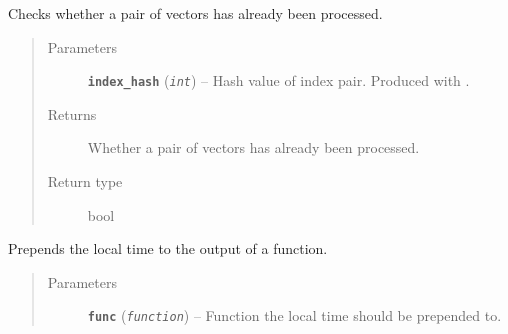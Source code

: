 \documentclass[letterpaper,10pt,english]{sphinxmanual}
\begin{document}
\begin{fulllineitems}
\begin{fulllineitems}
\end{fulllineitems}


\begin{fulllineitems}
\label{src.mapping:src.mapping.mapthreading.VectorDict.skippable}
Checks whether a pair of vectors has already been processed.
\begin{quote}\begin{description}
\item[{Parameters}] \leavevmode
\textbf{\texttt{index\_hash}} (\emph{\texttt{int}}) -- Hash value of index pair. Produced with .

\item[{Returns}] \leavevmode
Whether a pair of vectors has already been processed.

\item[{Return type}] \leavevmode
bool

\end{description}\end{quote}

\end{fulllineitems}


\end{fulllineitems}


\begin{fulllineitems}
\label{src.mapping:src.mapping.mapthreading.alt}
Prepends the local time to the output of a function.
\begin{quote}\begin{description}
\item[{Parameters}] \leavevmode
\textbf{\texttt{func}} (\emph{\texttt{function}}) -- Function the local time should be prepended to.

\end{description}\end{quote}

\end{fulllineitems}

\end{document}
